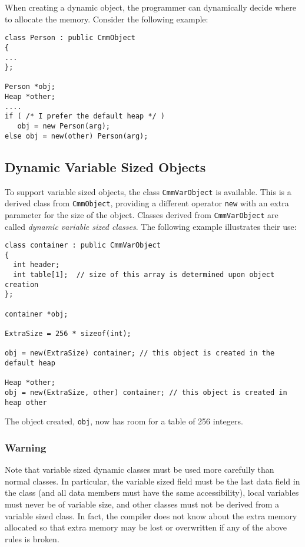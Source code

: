When creating a dynamic object, the 
programmer can dynamically decide where to allocate the memory. 
Consider the following example:

\begin{verbatim}
class Person : public CmmObject
{
...
};

Person *obj;
Heap *other;
....
if ( /* I prefer the default heap */ )
   obj = new Person(arg);
else obj = new(other) Person(arg);
\end{verbatim}


\subsection{Dynamic Variable Sized Objects}

To support variable sized objects, the class {\tt CmmVarObject} is
available.  This is a derived class from {\tt CmmObject}, providing a
different operator {\tt new} with an extra parameter for the size of
the object.  Classes derived from {\tt CmmVarObject} are called {\it
dynamic variable sized classes\/}.  The following example illustrates
their use:

\begin{verbatim}
class container : public CmmVarObject
{
  int header;
  int table[1];  // size of this array is determined upon object creation
};

container *obj;

ExtraSize = 256 * sizeof(int);

obj = new(ExtraSize) container; // this object is created in the default heap

Heap *other;
obj = new(ExtraSize, other) container; // this object is created in heap other
\end{verbatim}
The object created, {\tt obj}, now has room for a table of 256 integers.

\subsubsection*{Warning}

Note that variable sized dynamic classes must be used more carefully than
normal classes.  In particular, the variable sized field must be the last data
field in the class (and all data members must have the same accessibility),
local variables must never be of variable size, and other classes must not be
derived from a variable sized class.  In fact, the compiler does not know about
the extra memory allocated so that extra memory may be lost or overwritten
if any of the above rules is broken.

